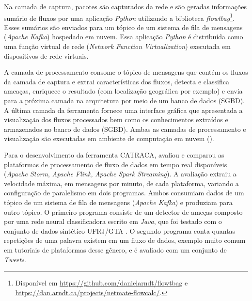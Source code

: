 

Na camada de captura, pacotes são capturados da rede e 
são geradas informações sumário de fluxos
por uma aplicação \emph{Python} utilizando a biblioteca \emph{flowtbag}\footnote{
    Disponível em \url{https://github.com/danielarndt/flowtbag} e
    \url{https://dan.arndt.ca/projects/netmate-flowcalc/}.
}.
Esses sumários são enviados para um tópico de um sistema de fila de mensagens
(\emph{Apache Kafka}) hospedado em nuvem.
Essa aplicação \emph{Python} é distribuída como uma função virtual de rede
(\emph{Network Function Virtualization}) executada em dispositivos de rede
virtuais.

A camada de processamento consome o tópico de mensagens que contém os fluxos
da camada de captura e extrai características dos fluxos, detecta e classifica ameaças,
enriquece o resultado (com localização geográfica por exemplo) e envia para a
próxima camada na arquitetura por meio de um banco de dados (SGBD).
A última camada da ferramenta fornece uma interface gráfica que apresentada a
visualização dos fluxos processados bem como os conhecimentos extraídos e
armazenados no banco de dados (SGBD).
Ambas as camadas de processamento e visualização são executadas em ambiente de
computação em nuvem (\cloud).

Para o desenvolvimento da ferramenta CATRACA,  avaliou e
comparou as plataformas de processamento de fluxo de dados em tempo real
disponíveis (\emph{Apache Storm}, \emph{Apache Flink}, \emph{Apache Spark Streaming}).
A avaliação extraiu a velocidade máxima, em mensagens por minuto,
de cada plataforma, variando a configuração de paralelismo
em dois programas.
Ambos consumiam dados de um tópico de um sistema de fila
de mensagens (\emph{Apache Kafka}) e produziam para outro tópico.
O primeiro programa consiste de um detector de ameças composto por
uma rede neural classificadora escrito em \emph{Java}, que foi testado
com o conjunto de dados sintético UFRJ/GTA \cite{Lopez2018}.
O segundo programa conta quantas repetições de uma palavra existem em um
fluxo de dados, exemplo muito comum em tutoriais de plataformas desse gênero,
e é avaliado com um conjunto de \emph{Tweets}.

